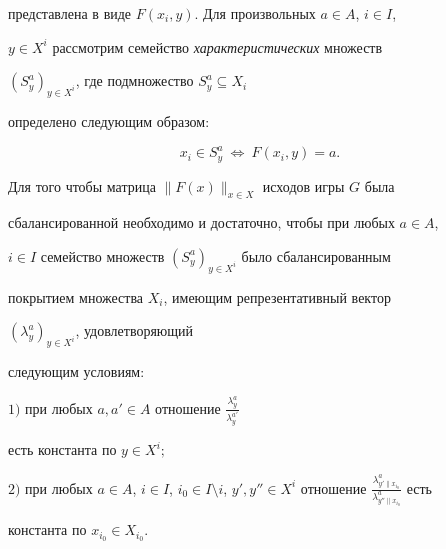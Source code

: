 представлена в виде $F(x_i,y)$. Для произвольных $a\in A$, $i\in I$, 


$y\in X^i$ рассмотрим семейство {\it характеристических} множеств 


$(S^a_y)_{y\in X^i}$, где подмножество $S^a_y\subseteq X_i$ 


определено следующим образом: 


$$ 


x_i\in S^a_y\ \Leftrightarrow\ F(x_i,y)=a. 


$$ 


 


\begin{thms} 


Для того чтобы матрица $\|F(x)\|_{x\in X}$ исходов игры $G$ была 


сбалансированной необходимо и достаточно, чтобы при любых $a\in A$, 


$i\in I$ семейство множеств $(S^a_y)_{y\in X^i}$ было сбалансированным 


покрытием множества $X_i$, имеющим репрезентативный вектор 


$(\lambda^a_y)_{y\in X^i}$, удовлетворяющий 


следующим условиям\/${:}$ 


 


$1)$ при любых $a,a'\in A$ отношение $\frac{\lambda^a_y}{\lambda^{a'}_y}$ 


есть константа по $y\in X^i;$ 


 


$2)$ при любых $a\in A$, $i\in I$, $i_0\in I\setminus i$, $y',y''\in 


X^i$ отношение $\frac{\lambda^a_{y'\|x_{i_0}}} 


{\lambda^a_{y''\|x_{i_0}}}$ есть 


константа по $x_{i_0}\in X_{i_0}$. 


\end{thms} 


 



